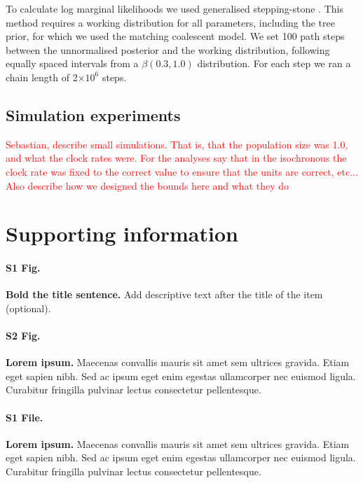 \documentclass[10pt,letterpaper]{article}
\begin{document}
To calculate log marginal likelihoods we used generalised stepping-stone \cite{baele2016genealogical,fan2011choosing}. This method requires a working distribution for all parameters, including the tree prior, for which we used the matching coalescent model. We set 100 path steps between the unnormalised posterior and the working distribution, following equally spaced intervals from a $\beta(0.3, 1.0)$ distribution. For each step we ran a chain length of 2$\times 10^{6}$ steps.

\subsection*{Simulation experiments}
\textcolor{red}{Sebastian, describe small simulations. That is, that the population size was 1.0, and what the clock rates were. For the analyses say that in the isochronous the clock rate was fixed to the correct value to ensure that the units are correct, etc... Also describe how we designed the bounds here and what they do}



\section*{Supporting information}

\paragraph*{S1 Fig.}
\label{S1_Fig}
{\bf Bold the title sentence.} Add descriptive text after the title of the item (optional).

\paragraph*{S2 Fig.}
\label{S2_Fig}
{\bf Lorem ipsum.} Maecenas convallis mauris sit amet sem ultrices gravida. Etiam eget sapien nibh. Sed ac ipsum eget enim egestas ullamcorper nec euismod ligula. Curabitur fringilla pulvinar lectus consectetur pellentesque.

\paragraph*{S1 File.}
\label{file:S1_File}
{\bf Lorem ipsum.}  Maecenas convallis mauris sit amet sem ultrices gravida. Etiam eget sapien nibh. Sed ac ipsum eget enim egestas ullamcorper nec euismod ligula. Curabitur fringilla pulvinar lectus consectetur pellentesque.
\end{document}
